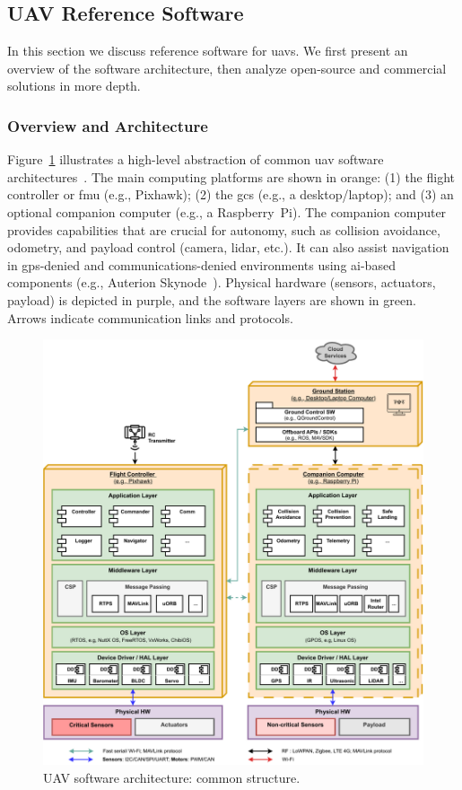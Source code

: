 \subsection{UAV Reference Software}%
\label{sec:uav-ref-sw}
In this section we discuss reference software for \glspl{uav}. 
We first present an overview of the software architecture, then analyze open-source and commercial solutions in more depth.

\subsubsection{Overview and Architecture}%
\label{sec:overv-arch-sw}
Figure~\ref{fig:uav-sw-arch} illustrates a high-level abstraction of common \gls{uav} software architectures~\cite{leccadito2018survey,px4-sysArch}.
The main computing platforms are shown in orange: 
(1) the flight controller or \gls{fmu} (e.g., Pixhawk); 
(2) the \gls{gcs} (e.g., a desktop/laptop); and 
(3) an optional companion computer (e.g., a Raspberry~Pi). 
The companion computer provides capabilities that are crucial for autonomy, such as collision avoidance, odometry, and payload control (camera, \gls{lidar}, etc.). 
It can also assist navigation in \gls{gps}-denied and communications-denied environments using \gls{ai}-based components (e.g., Auterion Skynode~\cite{skynodeS-noJamming}). 
Physical hardware (sensors, actuators, payload) is depicted in purple, and the software layers are shown in green. 
Arrows indicate communication links and protocols.

\begin{figure}[!hbt]
  \centering
  \includegraphics[width=\textwidth]{./img/pdf/uav-sw-arch.pdf}
  \caption{UAV software architecture: common structure.}
  \label{fig:uav-sw-arch}
\end{figure}

